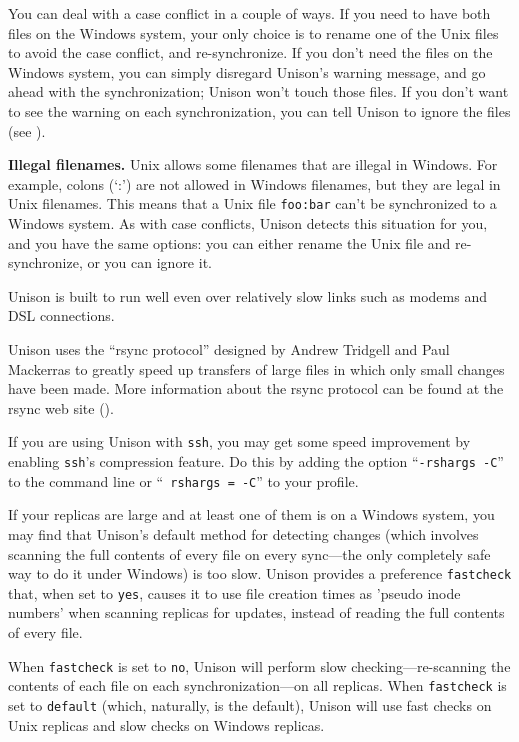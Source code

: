 \documentclass{article}
\begin{document}
You can deal with a case conflict in a couple of ways.  If you need to
have both files on the Windows system, your only choice is to rename
one of the Unix files to avoid the case conflict, and re-synchronize.
If you don't need the files on the Windows system, you can simply
disregard Unison's warning message, and go ahead with the
synchronization; Unison won't touch those files.  If you don't want to
see the warning on each synchronization, you can tell Unison to ignore
the files (see ).

\textbf{Illegal filenames.}  Unix allows some filenames that are
illegal in Windows.  For example, colons (`:') are not allowed in
Windows filenames, but they are legal in Unix filenames.  This means
that a Unix file \texttt{foo:bar} can't be synchronized to a Windows
system.  As with case conflicts, Unison detects this situation for
you, and you have the same options: you can either rename the Unix
file and re-synchronize, or you can ignore it.



Unison is built to run well even over relatively slow links such as
modems and DSL connections.  

Unison uses the ``rsync protocol'' designed by Andrew Tridgell and Paul
Mackerras to greatly speed up transfers of large files in which only
small changes have been made.  More information about the rsync protocol
can be found at the rsync web site ().

If you are using Unison with {\tt ssh}, you may get some speed
improvement by enabling {\tt ssh}'s compression feature.  Do this by
adding the option ``{\tt -rshargs -C}'' to the command line or ``{\tt
  rshargs = -C}'' to your profile.  



If your replicas are large and at least one of them is on a Windows
system, you may find that Unison's default method for detecting changes
(which involves scanning the full contents of every file on every
sync---the only completely safe way to do it under Windows) is too slow.
Unison provides a preference {\tt fastcheck} that, when set to
\verb|yes|, causes it to use file creation times as 'pseudo inode
numbers' when scanning replicas for updates, instead of reading the full
contents of every file.  

When \verb|fastcheck| is set to \verb|no|,
Unison will perform slow checking---re-scanning the contents of each file
on each synchronization---on all replicas.  When \verb|fastcheck| is set
to \verb|default| (which, naturally, is the default), Unison will use
fast checks on Unix replicas and slow checks on Windows replicas.
\end{document}
